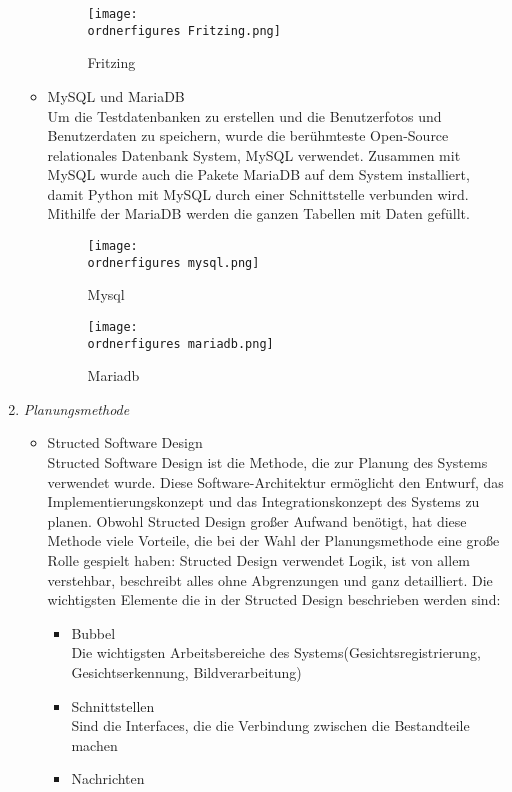 \begin{enumerate}
\begin{itemize}
		\begin{figure}[H]
			\texttt{[image: \\ordnerfigures Fritzing.png]}
			\centering
			\caption{Fritzing\cite{FritzingBild}}
		\end{figure}
		\item MySQL und MariaDB \\
		Um die Testdatenbanken zu erstellen und die Benutzerfotos und Benutzerdaten zu speichern, wurde die berühmteste Open-Source relationales Datenbank System, MySQL verwendet. Zusammen mit MySQL wurde auch die Pakete MariaDB auf dem System installiert, damit Python mit MySQL durch einer Schnittstelle verbunden wird. Mithilfe der MariaDB werden die ganzen Tabellen mit Daten gefüllt.
		\begin{figure}[H]
			\texttt{[image: \\ordnerfigures mysql.png]}
			\centering	
			\caption{Mysql\cite{MysqlBild}}
		\end{figure}
		\begin{figure}[H]
			\texttt{[image: \\ordnerfigures mariadb.png]}
			\centering	
			\caption{Mariadb\cite{MariadbBild}}
		\end{figure}
	\end{itemize}
	\item \textit{Planungsmethode} \\
	\begin{itemize}
		\item Structed Software Design \\
		Structed Software Design ist die Methode, die zur Planung des Systems verwendet wurde. Diese Software-Architektur ermöglicht den Entwurf, das Implementierungskonzept und das Integrationskonzept des Systems zu planen. Obwohl Structed Design großer Aufwand benötigt, hat diese Methode viele Vorteile, die bei der Wahl der Planungsmethode eine große Rolle gespielt haben: Structed Design verwendet Logik, ist von allem verstehbar, beschreibt alles ohne Abgrenzungen und ganz detailliert. Die wichtigsten Elemente die in der Structed Design beschrieben werden sind:
		\begin{itemize}
			\item Bubbel \\
			Die wichtigsten Arbeitsbereiche des Systems(Gesichtsregistrierung, Gesichtserkennung, Bildverarbeitung)
			\item Schnittstellen \\
			Sind die Interfaces, die die Verbindung zwischen die Bestandteile machen 
			\item Nachrichten \\

\end{itemize}
\end{itemize}
\end{enumerate}
